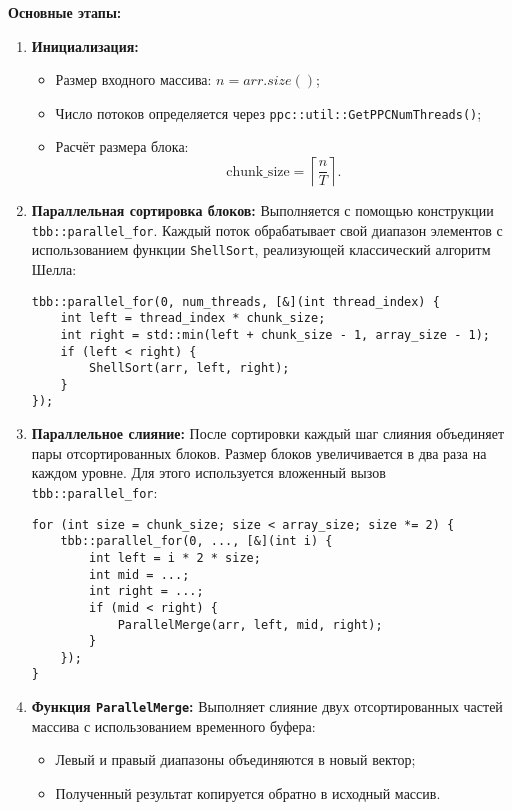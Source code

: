 \documentclass[12pt]{article}
\begin{document}
\textbf{Основные этапы:}
\begin{enumerate}
  \item \textbf{Инициализация:}
  \begin{itemize}
    \item Размер входного массива: $n = arr.size()$;
    \item Число потоков определяется через \texttt{ppc::util::GetPPCNumThreads()};
    \item Расчёт размера блока: 
    \[
    \text{chunk\_size} = \left\lceil \frac{n}{T} \right\rceil.
    \]
  \end{itemize}
  
  \item \textbf{Параллельная сортировка блоков:}
  Выполняется с помощью конструкции \texttt{tbb::parallel\_for}. Каждый поток обрабатывает свой диапазон элементов с использованием функции \texttt{ShellSort}, реализующей классический алгоритм Шелла:
  \begin{lstlisting}
tbb::parallel_for(0, num_threads, [&](int thread_index) {
    int left = thread_index * chunk_size;
    int right = std::min(left + chunk_size - 1, array_size - 1);
    if (left < right) {
        ShellSort(arr, left, right);
    }
});
  \end{lstlisting}

  \item \textbf{Параллельное слияние:}
  После сортировки каждый шаг слияния объединяет пары отсортированных блоков. Размер блоков увеличивается в два раза на каждом уровне. Для этого используется вложенный вызов \texttt{tbb::parallel\_for}:
  \begin{lstlisting}
for (int size = chunk_size; size < array_size; size *= 2) {
    tbb::parallel_for(0, ..., [&](int i) {
        int left = i * 2 * size;
        int mid = ...;
        int right = ...;
        if (mid < right) {
            ParallelMerge(arr, left, mid, right);
        }
    });
}
  \end{lstlisting}

  \item \textbf{Функция \texttt{ParallelMerge}:}
  Выполняет слияние двух отсортированных частей массива с использованием временного буфера:
  \begin{itemize}
    \item Левый и правый диапазоны объединяются в новый вектор;
    \item Полученный результат копируется обратно в исходный массив.
  \end{itemize}
\end{enumerate}
\end{document}
